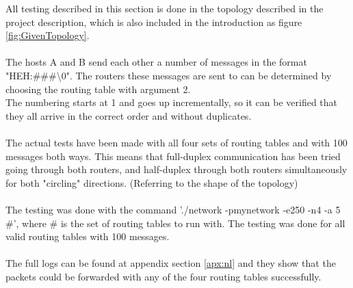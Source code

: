 All testing described in this section is done in the topology described in the project description, which is also included in the introduction as figure \ref{fig:GivenTopology}.
\\
\\
The hosts A and B send each other a number of messages in the format "HEH:\#\#\#\textbackslash0". The routers these messages are sent to can be determined by choosing the routing table with argument 2.\\
The numbering starts at 1 and goes up incrementally, so it can be verified that they all arrive in the correct order and without duplicates.\\
\\
The actual tests have been made with all four sets of routing tables and with 100 messages both ways. This means that full-duplex communication has been tried going through both routers, and half-duplex through both routers simultaneously for both "circling" directions. (Referring to the shape of the topology)\\
\\
The testing was done with the command './network -pmynetwork -e250 -n4 -a 5 \#', where \# is the set of routing tables to run with. The testing was done for all valid routing tables with 100 messages.\\
\\

The full logs can be found at appendix section \ref{apx:nl} and they show that the packets could be forwarded with any of the four routing tables successfully.

